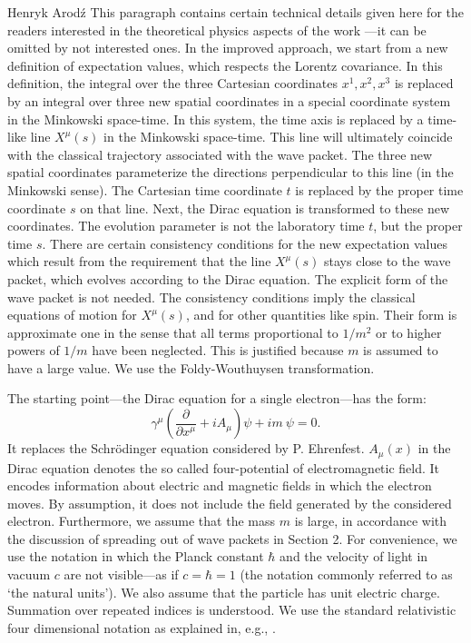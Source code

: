 \begin{artengenv}{Henryk Arod\'z}
This paragraph contains certain technical details given here for the readers interested in the theoretical physics aspects of the work \parencite{aro1}---it can be omitted by not interested ones. In the improved approach, we start from a new definition of expectation values, which respects the Lorentz covariance. In this definition, the integral over the three Cartesian coordinates $x^1, x^2, x^3$ is replaced by an integral over 
three new spatial coordinates in a special coordinate system in the Minkowski space-time. In this system, the time axis is replaced by 
a time-like line $X^{\mu}(s)$ in the Minkowski space-time. This line will ultimately coincide with the classical trajectory associated with the wave packet. The three new spatial coordinates parameterize the directions perpendicular to this line (in the Minkowski sense).
The Cartesian time coordinate $t$ is replaced by the proper time coordinate $s$ on that line. Next, the Dirac equation is transformed to these new coordinates. The evolution parameter is not the laboratory time $t$, but the proper time $s$. There are certain consistency conditions for the new expectation values which result from the requirement that 
the line $X^{\mu}(s)$ stays close to the wave packet, which evolves according to the Dirac equation. The explicit form of the wave packet is not needed. The consistency conditions imply the classical 
equations of motion for $X^{\mu}(s)$, and for other quantities like spin. Their form is approximate one in the sense that all terms proportional to $1/m^2$ or to higher powers of $1/m$ have been neglected. This is justified because $m$ is assumed to have a large value. We use the Foldy-Wouthuysen transformation. 


The starting point---the Dirac equation for a single electron---has the form: 
\[ \gamma^{\mu} \left(\frac{\partial}{\partial x^{\mu}} + i A_{\mu}\right)\psi + i m \: \psi =0. \]
It replaces the Schr\"odinger equation considered by P. Ehrenfest. 
 $A_{\mu}(x)$ in the Dirac equation denotes the so called four-potential of electromagnetic field. It encodes information about electric and magnetic fields in which the electron moves. By assumption, it does not include the field generated by the considered electron. Furthermore, we assume that the mass $m$ is large, in accordance with the discussion of spreading out of wave packets in Section 2. For convenience, we use the notation in which the Planck constant $\hbar$ and the velocity of light in vacuum $c$ are not visible---as if $c=\hbar =1$ (the notation commonly referred to as `the natural units'). 
We also assume that the particle has unit electric charge. Summation over repeated indices is understood. We use the standard relativistic four dimensional notation as explained in, e.g., \parencite[chap.1--2]{relat}.



\end{artengenv}
